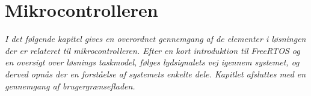 \chapter{Mikrocontrolleren}\label{kap:mcu}
\vspace*{0.5 cm}
\emph{I det følgende kapitel gives en overordnet gennemgang af de elementer i løsningen der er relateret til mikrocontrolleren. Efter en kort introduktion til FreeRTOS og en oversigt over løsnings taskmodel, følges lydsignalets vej igennem systemet, og derved opnås der en forståelse af systemets enkelte dele. Kapitlet afsluttes med en gennemgang af brugergrænsefladen.}